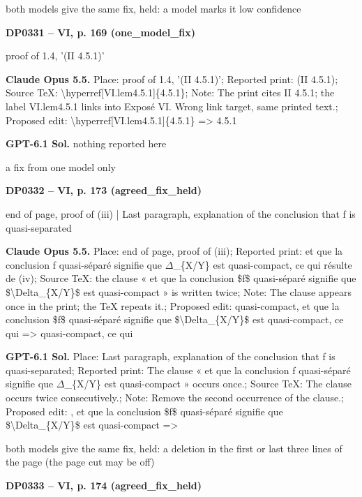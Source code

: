 both models give the same fix, held: a model marks it low confidence\par
\par\noindent\hypertarget{DP0331}{}\textbf{DP0331 -- VI, p. 169 (one\_model\_fix)}\par
proof of 1.4, '(II 4.5.1)'\par
\textbf{Claude Opus 5.5.} Place: proof of 1.4, '(II 4.5.1)'; Reported print: (II 4.5.1); Source TeX: \textbackslash{}hyperref[VI.lem4.5.1]\{4.5.1\}; Note: The print cites II 4.5.1; the label VI.lem4.5.1 links into Exposé VI. Wrong link target, same printed text.; Proposed edit: \textbackslash{}hyperref[VI.lem4.5.1]\{4.5.1\} =\allowbreak > 4.5.1\par
\textbf{GPT-6.1 Sol.} nothing reported here\par
a fix from one model only\par
\par\noindent\hypertarget{DP0332}{}\textbf{DP0332 -- VI, p. 173 (agreed\_fix\_held)}\par
end of page, proof of (iii) | Last paragraph, explanation of the conclusion that f is quasi-separated\par
\textbf{Claude Opus 5.5.} Place: end of page, proof of (iii); Reported print: et que la conclusion f quasi-séparé signifie que \ensuremath{\Delta}\_\{X/Y\} est quasi-compact, ce qui résulte de (iv); Source TeX: the clause « et que la conclusion \$f\$ quasi-séparé signifie que \$\textbackslash{}Delta\_\{X/Y\}\$ est quasi-compact » is written twice; Note: The clause appears once in the print; the TeX repeats it.; Proposed edit: quasi-compact, et que la conclusion \$f\$ quasi-séparé signifie que \$\textbackslash{}Delta\_\{X/Y\}\$ est quasi-compact, ce qui =\allowbreak > quasi-compact, ce qui\par
\textbf{GPT-6.1 Sol.} Place: Last paragraph, explanation of the conclusion that f is quasi-separated; Reported print: The clause « et que la conclusion f quasi-séparé signifie que \ensuremath{\Delta}\_\{X/Y\} est quasi-compact » occurs once.; Source TeX: The clause occurs twice consecutively.; Note: Remove the second occurrence of the clause.; Proposed edit: , et que la conclusion \$f\$ quasi-séparé signifie que \$\textbackslash{}Delta\_\{X/Y\}\$ est quasi-compact =\allowbreak > \par
both models give the same fix, held: a deletion in the first or last three lines of the page (the page cut may be off)\par
\par\noindent\hypertarget{DP0333}{}\textbf{DP0333 -- VI, p. 174 (agreed\_fix\_held)}\par
